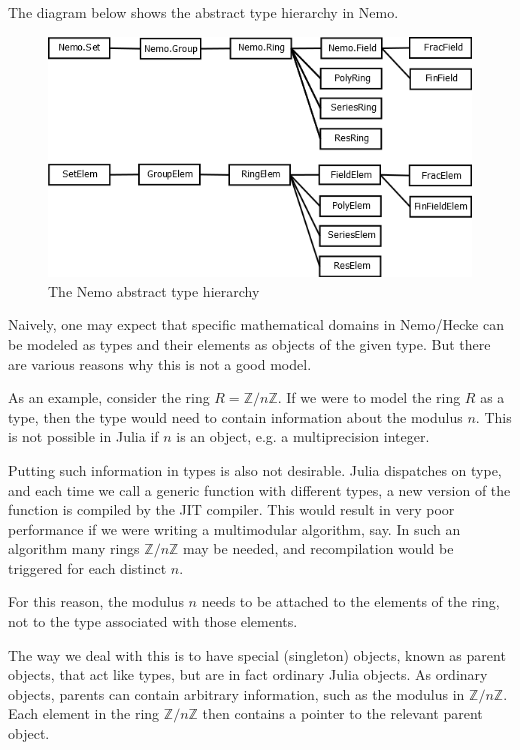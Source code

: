 \documentclass{sig-alternate-05-2015}
\begin{document}
The diagram below shows the abstract type hierarchy in Nemo.

\begin{figure}[h]
\centering
\includegraphics[scale=0.37]{types.png}
\caption{The Nemo abstract type hierarchy}
\end{figure}

Naively, one may expect that specific mathematical domains in Nemo/Hecke can be modeled as types
and their elements as objects of the given type. But there are various reasons why this is not a
good model.

As an example, consider the ring $R = \mathbb{Z}/n\mathbb{Z}$. If we were to model the ring $R$
as a type, then the type would need to contain information about the modulus $n$. This is not
possible in Julia if $n$ is an object, e.g. a multiprecision integer.

Putting such information in types is also not desirable. Julia dispatches on type, and each time
we call a generic function with different types, a new version of the function is compiled by the
JIT compiler. This would result in very poor performance if we were writing a multimodular
algorithm, say. In such an algorithm many rings $\mathbb{Z}/n\mathbb{Z}$ may be needed, and
recompilation would be triggered for each distinct $n$.

For this reason, the modulus $n$ needs to be attached to the elements of the ring, not to the type
associated with those elements.

The way we deal with this is to have special (singleton) objects, known as parent objects, that act
like types, but are in fact ordinary Julia objects. As ordinary objects, parents can contain
arbitrary information, such as the modulus in $\mathbb{Z}/n\mathbb{Z}$. Each element in the ring
$\mathbb{Z}/n\mathbb{Z}$ then contains a pointer to the relevant parent object.
\end{document}
